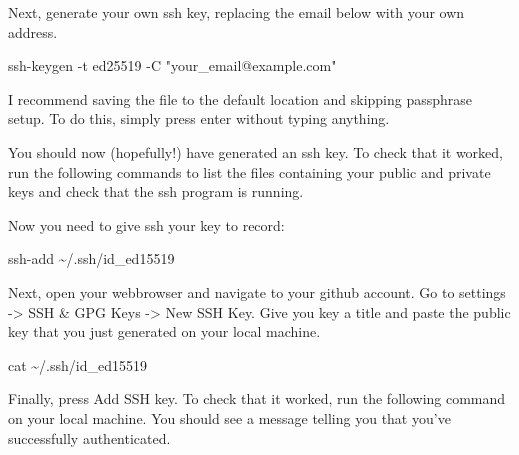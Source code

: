 \documentclass[
  letterpaper,
]{book}
\newenvironment{Shaded}{}{}
\newcommand{\AttributeTok}[1]{\textcolor[rgb]{0.84,0.23,0.29}{#1}}
\newcommand{\BuiltInTok}[1]{\textcolor[rgb]{0.84,0.23,0.29}{#1}}
\newcommand{\FunctionTok}[1]{\textcolor[rgb]{0.44,0.26,0.76}{#1}}
\newcommand{\NormalTok}[1]{\textcolor[rgb]{0.14,0.16,0.18}{#1}}
\newcommand{\PreprocessorTok}[1]{\textcolor[rgb]{0.84,0.23,0.29}{#1}}
\newcommand{\StringTok}[1]{\textcolor[rgb]{0.01,0.18,0.38}{#1}}
\newcommand{\VariableTok}[1]{\textcolor[rgb]{0.89,0.38,0.04}{#1}}
\begin{document}
Next, generate your own ssh key, replacing the email below with your own
address.

\begin{Shaded}
\begin{Highlighting}[]
\FunctionTok{ssh{-}keygen} \AttributeTok{{-}t}\NormalTok{ ed25519 }\AttributeTok{{-}C} \StringTok{"your\_email@example.com"}
\end{Highlighting}
\end{Shaded}

I recommend saving the file to the default location and skipping
passphrase setup. To do this, simply press enter without typing
anything.

You should now (hopefully!) have generated an ssh key. To check that it
worked, run the following commands to list the files containing your
public and private keys and check that the ssh program is running.

\begin{Shaded}
\end{Shaded}

Now you need to give ssh your key to record:

\begin{Shaded}
\begin{Highlighting}[]
\FunctionTok{ssh{-}add}\NormalTok{ \textasciitilde{}/.ssh/id\_ed15519}
\end{Highlighting}
\end{Shaded}

Next, open your webbrowser and navigate to your github account. Go to
settings -\textgreater{} SSH \& GPG Keys -\textgreater{} New SSH Key.
Give you key a title and paste the public key that you just generated on
your local machine.

\begin{Shaded}
\begin{Highlighting}[]
\FunctionTok{cat}\NormalTok{ \textasciitilde{}/.ssh/id\_ed15519}
\end{Highlighting}
\end{Shaded}

Finally, press Add SSH key. To check that it worked, run the following
command on your local machine. You should see a message telling you that
you've successfully authenticated.
\end{document}
